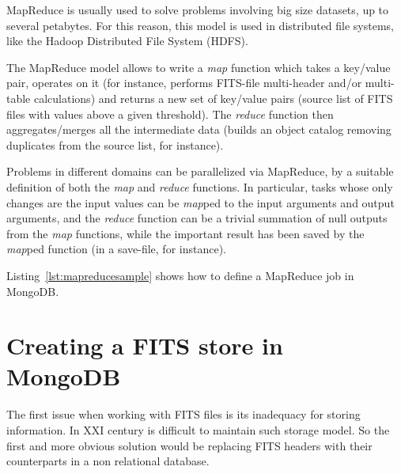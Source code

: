 MapReduce
is usually used %
to solve problems involving big size datasets, up to several petabytes. For this reason, this model is used in distributed file systems, like
the Hadoop Distributed File System (HDFS).

The MapReduce model allows to write a \emph{map} function which takes a key/value pair, operates on it
(for instance, performs FITS-file multi-header and/or multi-table calculations)
and returns a new set of key/value pairs
(source list of FITS files with values above a given threshold). %
The \emph{reduce} function then aggregates/merges all the intermediate data (builds an object catalog removing duplicates from the source list, for instance).

Problems in different domains can be parallelized via MapReduce, by a suitable definition of both the \emph{map} and \emph{reduce} functions. In particular, tasks whose only changes are the input values can be \emph{map}ped to the input arguments and output arguments, and the \emph{reduce} function can be a trivial summation of null outputs from the \emph{map} functions, while the important result has been saved by the \emph{map}ped function (in a save-file, for instance).


Listing~\ref{lst:mapreducesample} shows how to define a MapReduce job in MongoDB.






\section{Creating a FITS store in MongoDB} %
\label{sec:creating_a_fits_store_in_mongodb}

The first issue when working with FITS files is its inadequacy for storing information. In XXI century is difficult to maintain such storage model. So the first and more obvious solution would be replacing FITS headers with their counterparts in a non relational database. 

